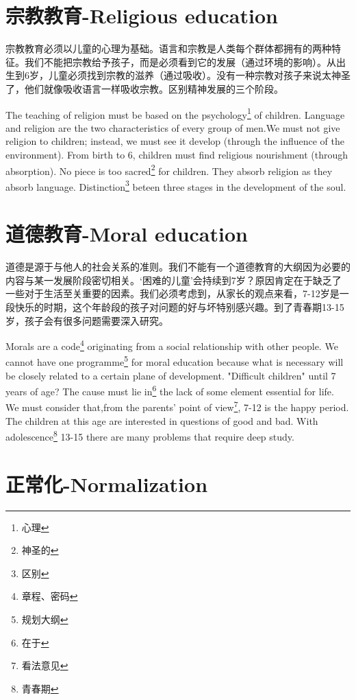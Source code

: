 \documentclass[lang=cn,10pt]{elegantbook}
\begin{document}
\chapter{宗教教育-Religious education}

宗教教育必须以儿童的心理为基础。语言和宗教是人类每个群体都拥有的两种特征。我们不能把宗教给予孩子，而是必须看到它的发展（通过环境的影响）。从出生到6岁，儿童必须找到宗教的滋养（通过吸收）。没有一种宗教对孩子来说太神圣了，他们就像吸收语言一样吸收宗教。区别精神发展的三个阶段。

The teaching of religion must be based on the psychology\footnote{心理} of children. Language and religion are the two characteristics of every group of men.We must not give religion to children; instead, we must see it develop (through the influence of the environment). From birth to 6, children must find religious nourishment (through absorption). No piece is too sacred\footnote{神圣的} for children. They absorb religion as they absorb language. Distinction\footnote{区别} beteen three stages in the development of the soul.

\chapter{道德教育-Moral education}

道德是源于与他人的社会关系的准则。我们不能有一个道德教育的大纲因为必要的内容与某一发展阶段密切相关。‘困难的儿童’会持续到7岁？原因肯定在于缺乏了一些对于生活至关重要的因素。我们必须考虑到，从家长的观点来看，7-12岁是一段快乐的时期，这个年龄段的孩子对问题的好与坏特别感兴趣。到了青春期13-15岁，孩子会有很多问题需要深入研究。

Morals are a code\footnote{章程、密码} originating from a social relationship with other people. We cannot have one programme\footnote{规划大纲} for moral education because what is necessary will be closely related to a certain plane of development. "Difficult children" until 7 years of age? The cause must lie in\footnote{在于} the lack of some element essential for life. We must consider that,from the parents' point of view\footnote{看法意见}, 7-12 is the happy period. The children at this age are interested in questions of good and bad. With adolescence\footnote{青春期} 13-15 there are many problems that require deep study.

\chapter{正常化-Normalization}
\end{document}
